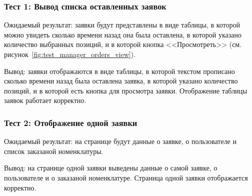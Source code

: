 \subsubsection*{Тест 1: Вывод списка оставленных заявок}

Ожидаемый результат: заявки будут представлены в виде таблицы,
в которой можно увидеть сколько времени назад она была оставлена,
в которой указано количество выбранных позиций,
и в которой кнопка <<Просмотреть>> (см. рисунок~\ref{fig:test_manager_orders_view}).




Вывод: заявки отображаются в виде таблицы,
в которой текстом прописано сколько времени назад была оставлена заявка,
в которой указано количество позиций,
и в которой есть кнопка для просмотра заявки.
Отображение таблицы заявок работает корректно.

\subsubsection*{Тест 2: Отображение одной заявки}

Ожидаемый результат: на странице будут данные о заявке, о пользователе и список заказаной номенклатуры.




Вывод: на странице одной заявки выведены данные о самой заявке, о пользователе и о заказаной номенклатуре.
Страница одной заявки отображается корректно.
